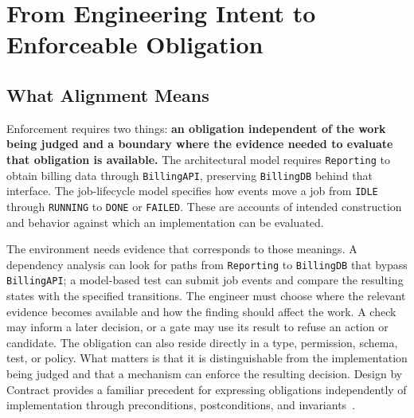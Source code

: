 


\chapter{From Engineering Intent to Enforceable Obligation}


\section{What Alignment Means}\label{heading:agreement-is-not-correctness}


Enforcement requires two things: \textbf{an obligation independent of the work being judged and a boundary where the evidence needed to evaluate that obligation is available.}
The architectural model requires \texttt{Reporting} to obtain billing data through \texttt{BillingAPI}, preserving \texttt{BillingDB} behind that interface.
The job-lifecycle model specifies how events move a job from \texttt{IDLE} through \texttt{RUNNING} to \texttt{DONE} or \texttt{FAILED}.
These are accounts of intended construction and behavior against which an implementation can be evaluated.


The environment needs evidence that corresponds to those meanings.
A dependency analysis can look for paths from \texttt{Reporting} to \texttt{BillingDB} that bypass \texttt{BillingAPI}; a model-based test can submit job events and compare the resulting states with the specified transitions.
The engineer must choose where the relevant evidence becomes available and how the finding should affect the work.
A check may inform a later decision, or a gate may use its result to refuse an action or candidate.
The obligation can also reside directly in a type, permission, schema, test, or policy.
What matters is that it is distinguishable from the implementation being judged and that a mechanism can enforce the resulting decision. Design by Contract provides a familiar precedent for expressing obligations independently of implementation through preconditions, postconditions, and invariants~\citep{meyer1997oosc}.

